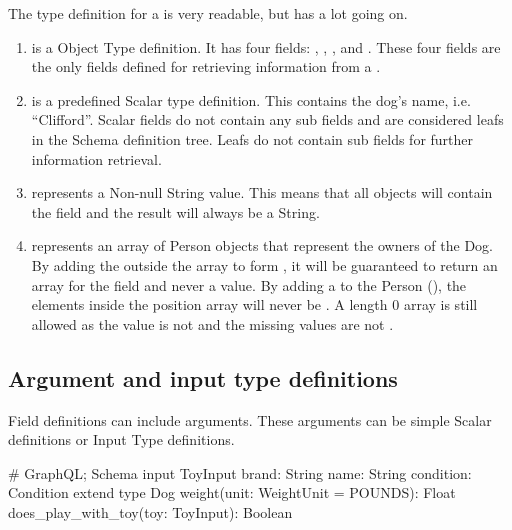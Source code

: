 \documentclass[stat,dissertation]{puthesis}\usepackage[]{graphicx}\usepackage{xcolor}
\begin{document}
The type definition for a  is very readable, but has a lot going on.

\begin{enumerate}
  \item {} is a Object Type definition.  It has four fields:  , , , and .  These four fields are the only fields defined for retrieving information from a .
  \item {} is a predefined Scalar type definition.  This contains the dog's name, i.e. ``Clifford''.  Scalar fields do not contain any sub fields and are considered leafs in the Schema definition tree. Leafs do not contain sub fields for further information retrieval.
  \item {} represents a Non-null String value.  This means that all  objects will contain the  field and the result will always be a String.
  \item \graphqlinline{[Person]} represents an array of Person objects that represent the owners of the Dog. By adding the \graphqlinline{!} outside the array to form \graphqlinline{[Person]!}, it will be guaranteed to return an array for the field  and never a  value.  By adding a \graphqlinline{!} to the Person (\graphqlinline{[ Person!]!}), the elements inside the position array will never be .  A length $0$ array is still allowed as the  value is not  and the missing  values are not .
\end{enumerate}


\subsection{Argument and input type definitions}

Field definitions can include arguments.  These arguments can be simple Scalar definitions or Input Type definitions.

\begin{graphqlcode}
# GraphQL; Schema
input ToyInput {
  brand: String
  name: String
  condition: Condition
}
extend type Dog {
  weight(unit: WeightUnit = POUNDS): Float
  does_play_with_toy(toy: ToyInput): Boolean
}
\end{graphqlcode}
\end{document}
